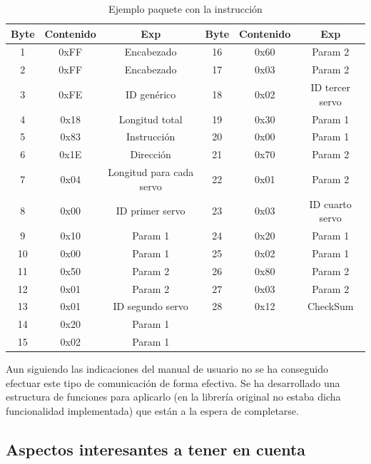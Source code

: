 		\begin{table}[htbp]
			\caption{Ejemplo paquete con la instrucción }
			\label{tab:syncwrite_paquet}
		 \begin{center}
				 	\begin{tabular}{|c|c|c||c|c|c|}
				 	
				 		\hline
				 		Byte & Contenido & Exp & Byte & Contenido & Exp \\
				 		\hline
				 		1 & 0xFF & Encabezado & 16 & 0x60 & Param 2 \\
				 		2 & 0xFF & Encabezado & 17 & 0x03 & Param 2 \\
				 		3 & 0xFE & ID genérico & 18 & 0x02 & ID tercer servo \\
				 		4 & 0x18 & Longitud total & 19 & 0x30 & Param 1 \\
				 		5 & 0x83 & Instrucción & 20 & 0x00 & Param 1 \\
				 		6 & 0x1E & Dirección & 21 & 0x70 & Param 2 \\
				 		7 & 0x04 & Longitud para cada servo & 22 & 0x01 & Param 2 \\
				 		8 & 0x00 & ID primer servo & 23 & 0x03 & ID cuarto servo \\
				 		9 & 0x10 & Param 1 & 24 & 0x20 & Param 1 \\
				 		10 & 0x00 & Param 1 & 25 & 0x02 & Param 1  \\
				 		11 & 0x50 & Param 2 & 26 & 0x80 & Param 2 \\
				 		12 & 0x01 & Param 2 & 27 & 0x03 & Param 2 \\
				 		13 & 0x01 & ID segundo servo & 28 & 0x12 & CheckSum \\
				 		14 & 0x20 & Param 1 &  &  & \\
				 		15 & 0x02 & Param 1 &  &  &   \\
				 		\hline
				 	\end{tabular}
		 \end{center}
		\end{table}
					 
		Aun siguiendo las indicaciones del manual de usuario no se ha conseguido efectuar este tipo de comunicación de forma efectiva. Se ha desarrollado una estructura de funciones para aplicarlo (en la librería original no estaba dicha funcionalidad implementada) que están a la espera de completarse.
				 
	\subsection{Aspectos interesantes a tener en cuenta}
				
